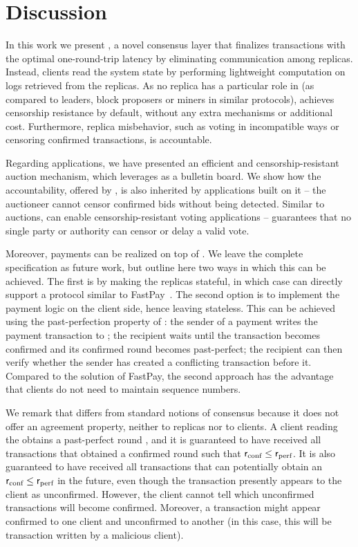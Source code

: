 \section{Discussion}
In this work we present \podtm, a novel consensus layer that finalizes transactions with the optimal one-round-trip latency by eliminating communication among replicas. Instead, clients read the system state by performing lightweight computation on logs retrieved from the replicas. As no replica has a particular role in \podtm (as compared to leaders, block proposers or miners in similar protocols), \podtm achieves censorship resistance by default, without any extra mechanisms or additional cost. Furthermore, replica misbehavior, such as voting in incompatible ways or censoring confirmed transactions, is accountable.

Regarding applications, we have presented an efficient and censorship-resistant auction mechanism, which leverages \podtm as a bulletin board. We show how the accountability, offered by \podtm, is also inherited by applications built on it -- the auctioneer cannot censor confirmed bids without being detected. Similar to auctions, \podtm can enable censorship-resistant voting applications -- \podtm guarantees that no single party or authority can censor or delay a valid vote.

Moreover, payments can be realized on top of \podtm. We leave the complete specification as future work, but outline here two ways in which this can be achieved. The first is by making the replicas stateful, in which case \podtm can directly support a protocol similar to FastPay~\cite{DBLP:conf/aft/BaudetDS20}. The second option is to implement the payment logic on the client side, hence leaving \podtm stateless. This can be achieved using the past-perfection property of \podtm: the sender of a payment  writes the payment transaction to \podtm; the recipient waits until the transaction becomes confirmed and its confirmed round becomes past-perfect; the recipient can then verify whether the sender has created a conflicting transaction before it. Compared to the solution of FastPay, the second approach has the advantage that clients do not need to maintain sequence numbers.

We remark that \podtm differs from standard notions of consensus because it does not offer an agreement property, neither to replicas nor to clients. A client reading the \podtm obtains a past-perfect round \rperf, and it is guaranteed to have received all transactions that obtained a confirmed round \rconf such that $\textsf{r}_\text{conf} \leq \textsf{r}_\text{perf}$. It is also guaranteed to have received all transactions that can potentially obtain an $\textsf{r}_\text{conf} \leq \textsf{r}_\text{perf}$ in the future, even though the transaction presently appears to the client as unconfirmed. However, the client cannot tell which unconfirmed transactions will become confirmed. Moreover, a transaction might appear confirmed to one client and unconfirmed to another (in this case, this will be transaction written by a malicious client).